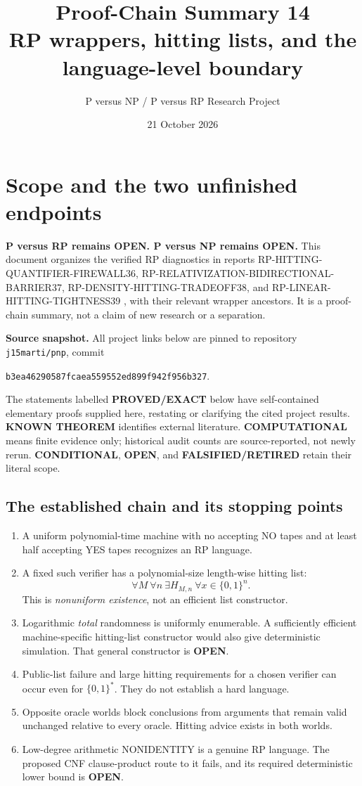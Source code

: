 \documentclass[11pt]{article}
\title{\vspace{-1.2cm}Proof-Chain Summary 14\\\large RP wrappers, hitting lists, and the language-level boundary}
\author{P versus NP / P versus RP Research Project}
\date{21 October 2026}
\begin{document}
\maketitle
\vspace{-1em}

\section{Scope and the two unfinished endpoints}
\textbf{P versus RP remains OPEN. P versus NP remains OPEN.}
This document organizes the verified RP diagnostics in reports
RP-HITTING-QUANTIFIER-FIREWALL36, RP-RELATIVIZATION-BIDIRECTIONAL-BARRIER37,
RP-DENSITY-HITTING-TRADEOFF38, and RP-LINEAR-HITTING-TIGHTNESS39
\cite{r36,r37,r38,r39}, with their relevant wrapper ancestors.
It is a proof-chain summary, not a claim of new research or a separation.

\textbf{Source snapshot.} All project links below are pinned to repository
\texttt{j15marti/pnp}, commit
\begin{center}\small\texttt{b3ea46290587fcaea559552ed899f942f956b327}.\end{center}
The statements labelled \textbf{PROVED/EXACT} below have self-contained
 elementary proofs supplied here, restating or clarifying the cited project
results. \textbf{KNOWN THEOREM} identifies external literature.
\textbf{COMPUTATIONAL} means finite evidence only; historical audit counts
are source-reported, not newly rerun. \textbf{CONDITIONAL}, \textbf{OPEN}, and
\textbf{FALSIFIED/RETIRED} retain their literal scope.

\subsection*{The established chain and its stopping points}
\begin{enumerate}
\item A uniform polynomial-time machine with no accepting NO tapes and at
least half accepting YES tapes recognizes an RP language.
\item A fixed such verifier has a polynomial-size length-wise hitting list:
\[
\forall M\ \forall n\ \exists H_{M,n}\ \forall x\in\{0,1\}^n.
\]
This is \emph{nonuniform existence}, not an efficient list constructor.
\item Logarithmic \emph{total} randomness is uniformly enumerable.
A sufficiently efficient machine-specific hitting-list constructor would also
 give deterministic simulation. That general constructor is \textbf{OPEN}.
\item Public-list failure and large hitting requirements for a chosen verifier
can occur even for $\{0,1\}^*$. They do not establish a hard language.
\item Opposite oracle worlds block conclusions from arguments that remain
valid unchanged relative to every oracle. Hitting advice exists in both worlds.
\item Low-degree arithmetic NONIDENTITY is a genuine RP language. The proposed
CNF clause-product route to it fails, and its required deterministic lower bound
is \textbf{OPEN}.
\end{enumerate}
\end{document}
